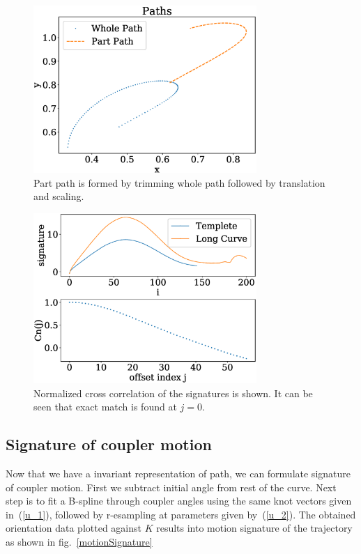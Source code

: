 \documentclass[twocolumn,10pt]{asme2ej}
\newcommand{\req}[1]{(\ref{#1})}
\begin{document}
\begin{figure}
\centering
\includegraphics[width=240pt]{figure/fig_whole_part.eps}
  \caption{Part path is formed by trimming whole path followed by translation and scaling.}
\label{wholePart}
\end{figure}

\begin{figure}
\centering
\includegraphics[width=240pt]{figure/fig_ncc.eps}
  \caption{Normalized cross correlation of the signatures is shown. It can be seen that exact match is found at $j=0$.}
\label{ncc}
\end{figure}

\subsection{Signature of coupler motion}\label{sec_sign}
Now that we have a invariant representation of path, we can formulate signature of coupler motion.
First we subtract initial angle from rest of the curve.
Next step is to fit a B-spline through coupler angles using the same knot vectors given in~\req{u_1}, followed by r-esampling at parameters given by~\req{u_2}.
The obtained orientation data plotted against $K$ results into motion signature of the trajectory as shown in fig.~\ref{motionSignature}
\end{document}
